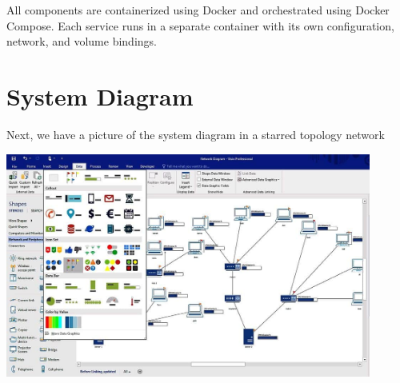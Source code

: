 \documentclass[12pt]{article}
\begin{document}
All components are containerized using Docker and orchestrated using Docker Compose. Each service runs in a separate container with its own configuration, network, and volume bindings.

\section{System Diagram}
Next, we have a picture of the system diagram in a starred topology network
 
\begin{center}
    \includegraphics[width=0.9\textwidth]{diagram.png}
     \label{diagram.png}
\end{center}
\end{document}
